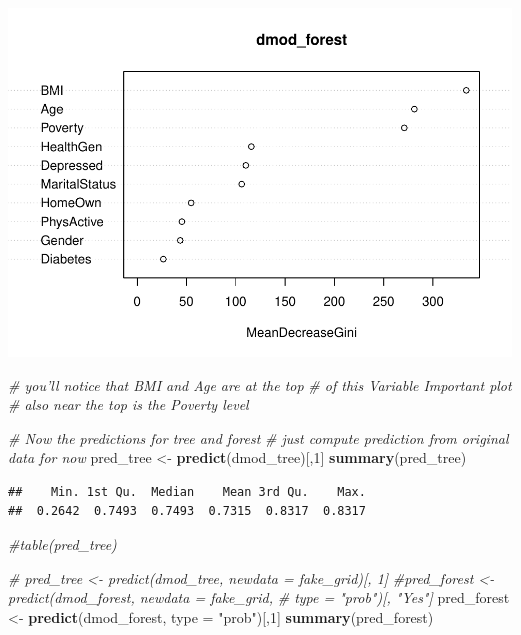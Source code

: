 \documentclass[]{article}
\newenvironment{Shaded}{\begin{snugshade}}{\end{snugshade}}
\newcommand{\KeywordTok}[1]{\textcolor[rgb]{0.13,0.29,0.53}{\textbf{{#1}}}}
\newcommand{\DataTypeTok}[1]{\textcolor[rgb]{0.13,0.29,0.53}{{#1}}}
\newcommand{\DecValTok}[1]{\textcolor[rgb]{0.00,0.00,0.81}{{#1}}}
\newcommand{\StringTok}[1]{\textcolor[rgb]{0.31,0.60,0.02}{{#1}}}
\newcommand{\CommentTok}[1]{\textcolor[rgb]{0.56,0.35,0.01}{\textit{{#1}}}}
\newcommand{\NormalTok}[1]{{#1}}
\begin{document}
\includegraphics{Hmwk7AnswerKey_files/figure-latex/unnamed-chunk-13-2.pdf}

\begin{Shaded}
\begin{Highlighting}[]
\CommentTok{# you'll notice that BMI and Age are at the top}
\CommentTok{# of this Variable Important plot}
\CommentTok{# also near the top is the Poverty level}

\CommentTok{# Now the predictions for tree and forest}
\CommentTok{# just compute prediction from original data for now}
\NormalTok{pred_tree <-}\StringTok{ }\KeywordTok{predict}\NormalTok{(dmod_tree)[,}\DecValTok{1}\NormalTok{]}
\KeywordTok{summary}\NormalTok{(pred_tree)}
\end{Highlighting}
\end{Shaded}

\begin{verbatim}
##    Min. 1st Qu.  Median    Mean 3rd Qu.    Max. 
##  0.2642  0.7493  0.7493  0.7315  0.8317  0.8317
\end{verbatim}

\begin{Shaded}
\begin{Highlighting}[]
\CommentTok{#table(pred_tree)}

\CommentTok{# pred_tree <- predict(dmod_tree, newdata = fake_grid)[, 1]}
\CommentTok{#pred_forest <- predict(dmod_forest, newdata = fake_grid, }
\CommentTok{#                       type = "prob")[, "Yes"]}
\NormalTok{pred_forest <-}\StringTok{ }\KeywordTok{predict}\NormalTok{(dmod_forest, }\DataTypeTok{type =} \StringTok{"prob"}\NormalTok{)[,}\DecValTok{1}\NormalTok{]}
\KeywordTok{summary}\NormalTok{(pred_forest)}
\end{Highlighting}
\end{Shaded}
\end{document}
